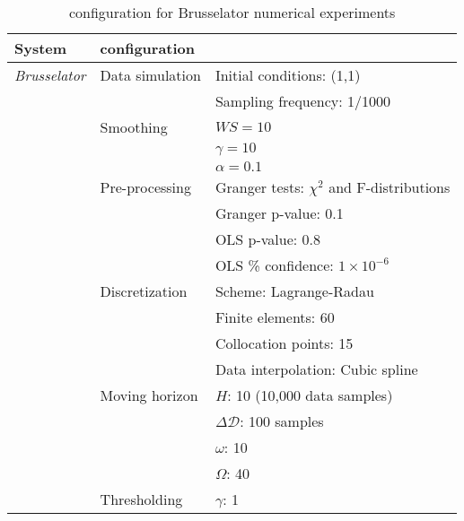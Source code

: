\documentclass[12pt]{article}
\begin{document}
\begin{table}[htb]
\caption{\ours{} configuration for Brusselator numerical experiments}
\vspace{-0.2in}
\label{tb:B_dysmo}
\begin{center}
\begin{tabular}{l l l}
\hline
\textbf{System}  &  \textbf{\ours{} configuration} &  \\
\hline
\hline
\textit{Brusselator}  & {Data simulation} & Initial conditions: (1,1)	\\
 & & Sampling frequency: 1/1000  \\
 &  {Smoothing} 	& $WS=10$   \\
 & & $\gamma=10$   \\
 & & $\alpha=0.1$   \\
 & {Pre-processing} & Granger tests: $\chi^2$ and F-distributions \\
 &  & Granger p-value: 0.1 \\
 & & OLS p-value: 0.8 \\
 & & OLS \% confidence: $1\times 10^{-6}$ \\
 & {Discretization} & Scheme: Lagrange-Radau \\
 & & Finite elements: 60 \\
 & & Collocation points: 15 \\
 & & Data interpolation: Cubic spline  \\
 & {Moving horizon} & $H$: 10 (10,000 data samples) \\
 & & $\Delta \mathcal{D}$: 100 samples \\
 & & $\omega$: 10 \\
 & & $\Omega$: 40 \\
 & {Thresholding} & $\gamma$: 1 \\
\hline
\end{tabular}
\end{center}
\end{table}
\end{document}
